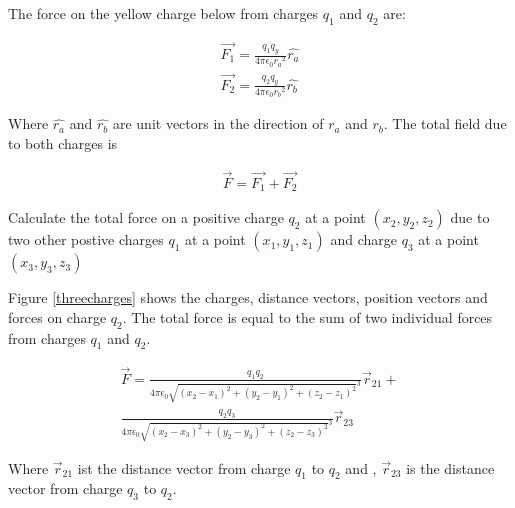 \documentclass{ximera}
\begin{document}
The force on the yellow charge below from charges $q_1$ and $q_2$ are:

\begin{eqnarray}
\vec{F_1}=\frac{q_1 q_y}{4 \pi \epsilon_{0} {r_a}^2} \hat{r_a} \label{field}\\
\vec{F_2}=\frac{q_2 q_y}{4 \pi \epsilon_{0} {r_b}^2} \hat{r_b}
\end{eqnarray}

Where $\hat{r_a}$ and $\hat{r_b}$ are unit vectors in the direction of $r_a$ and $r_b$. The total field due to both charges is


\begin{eqnarray}
\vec{F}=\vec{F_1} + \vec{F_2} 
\end{eqnarray}




\begin{example}

Calculate the total force on a positive charge $q_2$ at a point $(x_2,y_2,z_2)$ due to two other postive charges $q_1$ at a point $(x_1,y_1,z_1)$ and charge $q_3$ at a point $(x_3,y_3,z_3)$


\begin{explanation}



Figure \ref{threecharges} shows the charges, distance vectors, position vectors and forces on charge $q_2$. The total force is equal to the sum of two individual forces from charges $q_1$ and $q_2$.

\begin{eqnarray}
\vec{F}= \frac{q_1 q_2}{4 \pi \epsilon_{0} {\sqrt{(x_2 - x_1)^2 +(y_2 - y_1)^2 +  (z_2 - z_1)^2}^3}} \vec{r}_{21} + \\ \nonumber
 \frac{q_2 q_3}{4 \pi \epsilon_{0} {\sqrt{(x_2 - x_3)^2 +(y_2 - y_3)^2 +(z_2 - z_3)^2}
}^3} \vec{r}_{23} 
\end{eqnarray}

Where $\vec{r}_{21}$ ist the distance vector from charge $q_1$ to $q_2$ and , $\vec{r}_{23}$ is the distance vector from charge $q_3$ to $q_2$.


\end{explanation}
\end{example}
\end{document}
